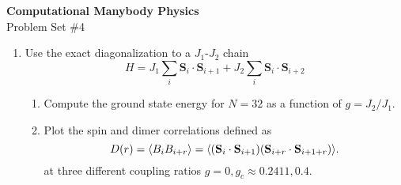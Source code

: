 \documentclass[12pt]{article}
\begin{document}
\begin{center}
\Large
\textbf{Computational Manybody Physics}\\
\large
Problem Set \#4\\


\end{center}


\begin{enumerate}
\item Use the exact diagonalization to a $J_1$-$J_2$ chain 
\begin{equation}
H=J_1\sum_{i} \mathbf{S}_i\cdot \mathbf{S}_{i+1}+J_2\sum_{i} \mathbf{S}_i\cdot \mathbf{S}_{i+2}
\end{equation}
\begin{enumerate}
\item Compute the ground state energy for  $N=32$ as  a function of $g=J_2/J_1$.
\item  Plot the spin and dimer correlations  defined as 
\begin{equation}
D(r) = \langle B_iB_{i+r}\rangle =\langle ({\bf S}_i \cdot {\bf S}_{i+1})({\bf S}_{i+r} \cdot {\bf S}_{i+1+r}) \rangle.
\label{drdef}
\end{equation}
 at three different coupling ratios $g=0, g_c \approx 0.2411, 0.4$. 
\end{enumerate}
\end{enumerate}
\end{document}
